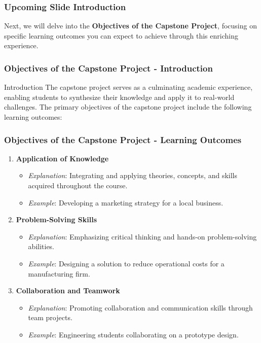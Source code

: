 \documentclass[aspectratio=169]{beamer}
\begin{document}
\begin{frame}[fragile]
    \frametitle{Upcoming Slide Introduction}
    Next, we will delve into the \textbf{Objectives of the Capstone Project}, focusing on specific learning outcomes you can expect to achieve through this enriching experience.
\end{frame}

\begin{frame}[fragile]
    \frametitle{Objectives of the Capstone Project - Introduction}
    \begin{block}{Introduction}
        The capstone project serves as a culminating academic experience, enabling students to synthesize their knowledge and apply it to real-world challenges. The primary objectives of the capstone project include the following learning outcomes:
    \end{block}
\end{frame}

\begin{frame}[fragile]
    \frametitle{Objectives of the Capstone Project - Learning Outcomes}
    \begin{enumerate}
        \item \textbf{Application of Knowledge}
            \begin{itemize}
                \item \textit{Explanation}: Integrating and applying theories, concepts, and skills acquired throughout the course.
                \item \textit{Example}: Developing a marketing strategy for a local business.
            \end{itemize}

        \item \textbf{Problem-Solving Skills}
            \begin{itemize}
                \item \textit{Explanation}: Emphasizing critical thinking and hands-on problem-solving abilities.
                \item \textit{Example}: Designing a solution to reduce operational costs for a manufacturing firm.
            \end{itemize}

        \item \textbf{Collaboration and Teamwork}
            \begin{itemize}
                \item \textit{Explanation}: Promoting collaboration and communication skills through team projects.
                \item \textit{Example}: Engineering students collaborating on a prototype design.
            \end{itemize}
    \end{enumerate}
\end{frame}
\end{document}
